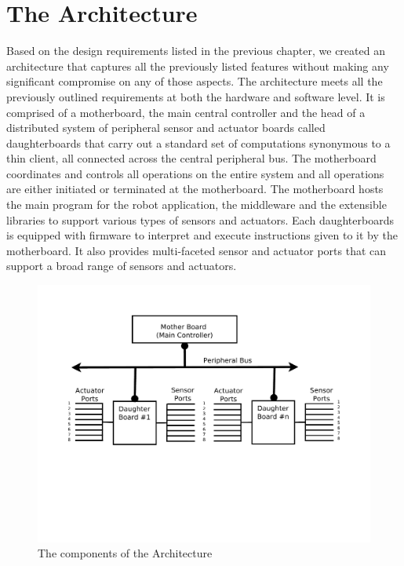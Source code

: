 \section{The Architecture} %
\label{sec:the_architecture}
Based on the design requirements listed in the previous chapter, we created an architecture that captures all the previously listed features without making any significant compromise on any of those aspects. The \xten architecture meets all the previously outlined requirements at both the hardware and software level. It is comprised of a motherboard, the main central controller and the head of a distributed system of peripheral sensor and actuator boards called daughterboards that carry out a standard set of computations synonymous to a thin client, all connected across the central peripheral bus. The motherboard coordinates and controls all operations on the entire system and all operations are either initiated or terminated at the motherboard. The motherboard hosts the main program for the robot application, the middleware and the extensible libraries to support various types of sensors and actuators. Each daughterboards is equipped with firmware to interpret and execute instructions given to it by the motherboard. It also provides multi-faceted sensor and actuator ports that can support a broad range of sensors and actuators. 

\begin{figure}[h]
  \begin{center}
    \includegraphics{Figures/system_block_diagram.pdf}
    \caption{The components of the \xten Architecture}
  \end{center}
\end{figure}


